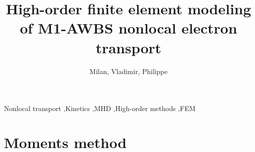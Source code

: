 \documentclass[review]{elsarticle}
\begin{document}
\begin{frontmatter}

\title{High-order finite element modeling of M1-AWBS nonlocal electron transport}

\author[celiaaddress]{Milan, Vladimir, Philippe}
\address[celiaaddress]{Universit\'{e} de Bordeaux - CNRS - CEA, CELIA, UMR 5107, F-33405 Talence, France}


\begin{abstract}

\end{abstract}

\begin{keyword}
Nonlocal transport \sep Kinetics \sep MHD \sep High-order methods \sep FEM
\end{keyword}

\end{frontmatter}

\linenumbers


\newpage

\section{Moments method}\label{sec:moment_method}
\end{document}
